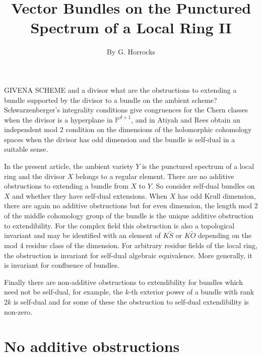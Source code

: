 \title{Vector Bundles on the Punctured Spectrum of a Local Ring II}\label{chap7}
\markright{}

\author{By G. Horrocks}

\date{}
\maketitle

\setcounter{page}{155}

\setcounter{pageoriginal}{206}
GIVEN\pageoriginale A SCHEME and a divisor what are the obstructions
to extending a bundle supported by the divisor to a bundle on the
ambient scheme? Schwarzenberger's integrality
conditions \cite{chap7-key5} give congruences for the Chern classes
when the divisor is a hyperplane in $\mathbb{P}^{d+1}$, and
in \cite{chap7-key3} Atiyah and Rees obtain an independent mod 2
condition on the dimensions of the holomorphic cohomology spaces when
the divisor has odd dimension and the bundle is self-dual in a
suitable sense.

In the present article, the ambient variety $Y$ is the punctured
spectrum of a local ring and the divisor $X$ belongs to a regular
element. There are no additive obstructions to extending a bundle from
$X$ to $Y$. So consider self-dual bundles on $X$ and whether they have
self-dual extensions. When $X$ has odd Krull dimension, there are
again no additive obstructions but for even dimension, the length mod
2 of the middle cohomology group of the bundle is the unique additive
obstruction to extendibility. For the complex field this obstruction
is also a topological invariant and may be identified with an element
of $K\widetilde{S}$ or $K\widetilde{O}$ depending on the mod 4 residue
class of the dimension. For arbitrary residue fields of the local
ring, the obstruction is invariant for self-dual algebraic
equivalence. More generally, it is invariant for confluence of
bundles. 

Finally there are non-additive obstructions to extendibility for
bundles which need not be self-dual, for example, the $k$-th exterior
power of a bundle with rank $2k$ is self-dual and for some of these
the obstruction to self-dual extendibility is non-zero. 

\section{No additive obstructions}\label{chap7-sec1}\pageoriginale


